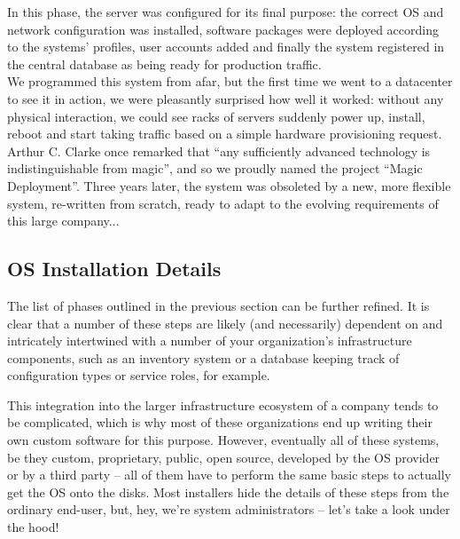 \begin{experience}
In this phase, the server was configured for its final
purpose: the correct OS and network configuration was
installed, software packages were deployed according
to the systems' profiles, user accounts added and
finally the system registered in the central database
as being ready for production traffic. \\ [10pt]

We programmed this system from afar, but the first
time we went to a datacenter to see it in action, we
were pleasantly surprised how well it worked: without
any physical interaction, we could see racks of
servers suddenly power up, install, reboot and start
taking traffic based on a simple hardware provisioning
request. \\ [10pt]

Arthur C. Clarke once remarked
that ``any sufficiently advanced technology is
indistinguishable from magic'', and so we proudly
named the project ``Magic Deployment''.  Three years
later, the system was obsoleted by a new, more
flexible system, re-written from scratch, ready to
adapt to the evolving requirements of this large
company...
\end{experience}

\subsection{OS Installation Details}
\label{software-installation:os-installation:details}

The list of phases outlined in the previous section
can be further refined.  It is clear that a number of
these steps are likely (and necessarily) dependent on
and intricately intertwined with a number of your
organization's infrastructure components, such as an
inventory system or a database keeping track of
configuration types or service roles, for example.

This integration into the larger infrastructure
ecosystem of a company tends to be complicated, which
is why most of these organizations end up writing
their own custom software for this purpose.  However,
eventually all of these systems, be they custom,
proprietary, public, open source, developed by the OS
provider or by a third party -- all of them have to
perform the same basic steps to actually get the OS
onto the disks.  Most installers hide the details of
these steps from the ordinary end-user, but, hey,
we're system administrators -- let's take a look under
the hood!  \\


